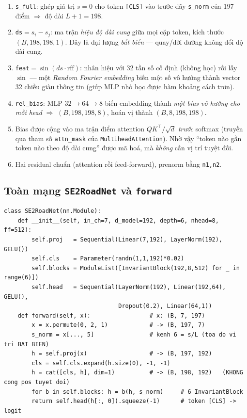 \documentclass[11pt]{article}
\newcommand{\code}[1]{\textcolor{cInk}{\texttt{#1}}}
\theoremstyle{definition}
\begin{document}
\begin{enumerate}[leftmargin=1.6em,label=\textbf{I\arabic*.}]
\item \code{s\_full}: ghép giá trị $s=0$ cho token \code{[CLS]} vào trước dãy
\code{s\_norm} của 197 điểm $\Rightarrow$ độ dài $L{+}1=198$.
\item \code{ds}$=s_i-s_j$: ma trận \emph{hiệu độ dài cung} giữa mọi cặp token,
kích thước $(B,198,198,1)$. Đây là đại lượng \emph{bất biến} --- quay/dời đường
không đổi độ dài cung.
\item \code{feat}$=\sin(ds\cdot\text{rff})$: nhân hiệu với 32 tần số cố định
(không học) rồi lấy $\sin$ --- một \emph{Random Fourier embedding} biến một số
vô hướng thành vector 32 chiều giàu thông tin (giúp MLP nhỏ học được hàm khoảng
cách trơn).
\item \code{rel\_bias}: MLP $32\to64\to8$ biến embedding thành \emph{một bias
vô hướng cho mỗi head} $\Rightarrow$ $(B,198,198,8)$, hoán vị thành
$(B,8,198,198)$.
\item Bias được cộng vào ma trận điểm attention $QK^\top/\sqrt d$ \emph{trước}
softmax (truyền qua tham số \code{attn\_mask} của \code{MultiheadAttention}).
Nhờ vậy ``token nào gần token nào theo độ dài cung'' được mã hoá, mà \emph{không}
cần vị trí tuyệt đối.
\item Hai residual chuẩn (attention rồi feed-forward), prenorm bằng \code{n1,n2}.
\end{enumerate}

\subsection{Toàn mạng \code{SE2RoadNet} và \code{forward}}
\begin{lstlisting}
class SE2RoadNet(nn.Module):
    def __init__(self, in_ch=7, d_model=192, depth=6, nhead=8, ff=512):
        self.proj   = Sequential(Linear(7,192), LayerNorm(192), GELU())
        self.cls    = Parameter(randn(1,1,192)*0.02)
        self.blocks = ModuleList([InvariantBlock(192,8,512) for _ in range(6)])
        self.head   = Sequential(LayerNorm(192), Linear(192,64), GELU(),
                                 Dropout(0.2), Linear(64,1))
    def forward(self, x):                 # x: (B, 7, 197)
        x = x.permute(0, 2, 1)            # -> (B, 197, 7)
        s_norm = x[..., 5]                # kenh 6 = s/L (toa do vi tri BAT BIEN)
        h = self.proj(x)                  # -> (B, 197, 192)
        cls = self.cls.expand(h.size(0), -1, -1)
        h = cat([cls, h], dim=1)          # -> (B, 198, 192)   (KHONG cong pos tuyet doi)
        for b in self.blocks: h = b(h, s_norm)     # 6 InvariantBlock
        return self.head(h[:, 0]).squeeze(-1)      # token [CLS] -> logit
\end{lstlisting}
\end{document}
